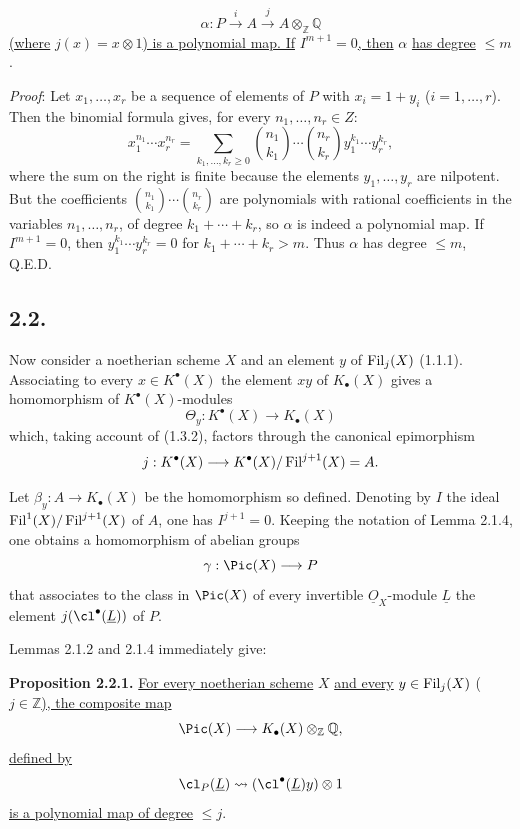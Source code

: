 %

\[
\alpha:P\xrightarrow{i}A\xrightarrow{j}A\otimes_{\mathbb Z}\mathbb Q
\]
\uline{(where} $j(x)=x\otimes1$\uline{) is a polynomial map. If} $I^{m+1}=0$\uline{, then} $\alpha$ \uline{has degree} $\leq m$.

\emph{Proof}: Let $x_1,\ldots,x_r$ be a sequence of elements of $P$ with $x_i=1+y_i$ ($i=1,\ldots,r$). Then the binomial formula gives, for every $n_1,\ldots,n_r\in Z$:
\begin{equation}\tag{2.1.5}
x_1^{n_1}\cdots x_r^{n_r}=
\sum_{k_1,\ldots,k_r\geq0}\binom{n_1}{k_1}\cdots\binom{n_r}{k_r}y_1^{k_1}\cdots y_r^{k_r},
\end{equation}
where the sum on the right is finite because the elements $y_1,\ldots,y_r$ are nilpotent. But the coefficients $\binom{n_1}{k_1}\cdots\binom{n_r}{k_r}$ are polynomials with rational coefficients in the variables $n_1,\ldots,n_r$, of degree $k_1+\cdots+k_r$, so $\alpha$ is indeed a polynomial map. If $I^{m+1}=0$, then $y_1^{k_1}\cdots y_r^{k_r}=0$ for $k_1+\cdots+k_r>m$. Thus $\alpha$ has degree $\leq m$, Q.E.D.

\subsection*{2.2.}
Now consider a noetherian scheme $X$ and an element $y$ of $\operatorname{Fil}_j(X)$ (1.1.1). Associating to every $x\in K^{\bullet}(X)$ the element $xy$ of $K_\bullet(X)$ gives a homomorphism of $K^{\bullet}(X)$-modules
\[
\Theta_y:K^{\bullet}(X)\longrightarrow K_\bullet(X)
\]
which, taking account of (1.3.2), factors through the canonical epimorphism
\[
j:K^{\bullet}(X)\longrightarrow K^{\bullet}(X)/\operatorname{Fil}^{j+1}(X)=A.
\]


%

Let $\beta_y:A\to K_\bullet(X)$ be the homomorphism so defined. Denoting by $I$ the ideal $\operatorname{Fil}^1(X)/\operatorname{Fil}^{j+1}(X)$ of $A$, one has $I^{j+1}=0$. Keeping the notation of Lemma 2.1.4, one obtains a homomorphism of abelian groups
\[
\gamma:\Pic(X)\longrightarrow P
\]
that associates to the class in $\Pic(X)$ of every invertible $\underline{O}_X$-module $\underline{L}$ the element $j(\cl^{\bullet}(\underline{L}))$ of $P$.

Lemmas 2.1.2 and 2.1.4 immediately give:

\textbf{Proposition 2.2.1.} \uline{For every noetherian scheme} $X$ \uline{and every} $y\in\operatorname{Fil}_j(X)$ ($j\in\mathbb Z$\uline{), the composite map}
\[
\Pic(X)\longrightarrow K_\bullet(X)\otimes_{\mathbb Z}\mathbb Q,
\]
\uline{defined by}
\[
\cl_P(\underline{L})\rightsquigarrow (\cl^{\bullet}(\underline{L})y)\otimes1
\]
\uline{is a polynomial map of degree} $\leq j$.

